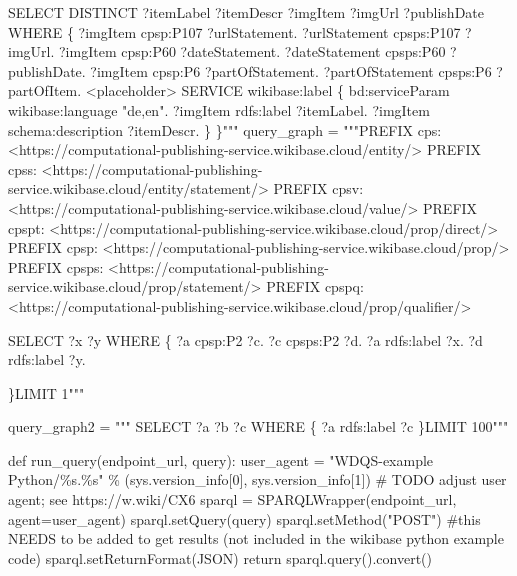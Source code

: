 \documentclass[
  a4paper,
]{book}
\newenvironment{Shaded}{\begin{snugshade}}{\end{snugshade}}
\newcommand{\AlertTok}[1]{\textcolor[rgb]{0.68,0.00,0.00}{#1}}
\newcommand{\CommentTok}[1]{\textcolor[rgb]{0.37,0.37,0.37}{#1}}
\newcommand{\ControlFlowTok}[1]{\textcolor[rgb]{0.00,0.23,0.31}{#1}}
\newcommand{\DecValTok}[1]{\textcolor[rgb]{0.68,0.00,0.00}{#1}}
\newcommand{\KeywordTok}[1]{\textcolor[rgb]{0.00,0.23,0.31}{#1}}
\newcommand{\NormalTok}[1]{\textcolor[rgb]{0.00,0.23,0.31}{#1}}
\newcommand{\OperatorTok}[1]{\textcolor[rgb]{0.37,0.37,0.37}{#1}}
\newcommand{\SpecialCharTok}[1]{\textcolor[rgb]{0.37,0.37,0.37}{#1}}
\newcommand{\StringTok}[1]{\textcolor[rgb]{0.13,0.47,0.30}{#1}}
\begin{document}
\begin{Shaded}
\begin{Highlighting}[]
\StringTok{SELECT DISTINCT ?itemLabel ?itemDescr ?imgItem ?imgUrl ?publishDate }
\StringTok{WHERE}
\StringTok{\{}
\StringTok{  ?imgItem cpsp:P107 ?urlStatement. }
\StringTok{  ?urlStatement cpsps:P107 ?imgUrl. }
\StringTok{  ?imgItem cpsp:P60 ?dateStatement. }
\StringTok{  ?dateStatement cpsps:P60 ?publishDate.}
\StringTok{  ?imgItem cpsp:P6 ?partOfStatement.}
\StringTok{  ?partOfStatement cpsps:P6 ?partOfItem.}
\StringTok{  \textless{}placeholder\textgreater{} }
\StringTok{  SERVICE wikibase:label \{}
\StringTok{      bd:serviceParam wikibase:language "de,en".}
\StringTok{      ?imgItem rdfs:label ?itemLabel.}
\StringTok{      ?imgItem schema:description ?itemDescr.}
\StringTok{    \}}
\StringTok{\}"""}
\NormalTok{query\_graph }\OperatorTok{=} \StringTok{"""PREFIX cps: \textless{}https://computational{-}publishing{-}service.wikibase.cloud/entity/\textgreater{}}
\StringTok{PREFIX cpss: \textless{}https://computational{-}publishing{-}service.wikibase.cloud/entity/statement/\textgreater{}}
\StringTok{PREFIX cpsv: \textless{}https://computational{-}publishing{-}service.wikibase.cloud/value/\textgreater{}}
\StringTok{PREFIX cpspt: \textless{}https://computational{-}publishing{-}service.wikibase.cloud/prop/direct/\textgreater{}}
\StringTok{PREFIX cpsp: \textless{}https://computational{-}publishing{-}service.wikibase.cloud/prop/\textgreater{}}
\StringTok{PREFIX cpsps: \textless{}https://computational{-}publishing{-}service.wikibase.cloud/prop/statement/\textgreater{}}
\StringTok{PREFIX cpspq: \textless{}https://computational{-}publishing{-}service.wikibase.cloud/prop/qualifier/\textgreater{}}

\StringTok{SELECT ?x ?y}
\StringTok{WHERE}
\StringTok{\{}
\StringTok{  ?a cpsp:P2 ?c.}
\StringTok{  ?c cpsps:P2 ?d.}
\StringTok{  ?a rdfs:label ?x.}
\StringTok{  ?d rdfs:label ?y.}

\StringTok{\}LIMIT 1"""}

\NormalTok{query\_graph2 }\OperatorTok{=} \StringTok{"""}
\StringTok{SELECT ?a ?b ?c}
\StringTok{WHERE}
\StringTok{\{}
\StringTok{  ?a rdfs:label ?c}
\StringTok{\}LIMIT 100"""}


\KeywordTok{def}\NormalTok{ run\_query(endpoint\_url, query):}
\NormalTok{    user\_agent }\OperatorTok{=} \StringTok{"WDQS{-}example Python/}\SpecialCharTok{\%s}\StringTok{.}\SpecialCharTok{\%s}\StringTok{"} \OperatorTok{\%}\NormalTok{ (sys.version\_info[}\DecValTok{0}\NormalTok{], sys.version\_info[}\DecValTok{1}\NormalTok{])}
    \CommentTok{\# }\AlertTok{TODO}\CommentTok{ adjust user agent; see https://w.wiki/CX6}
\NormalTok{    sparql }\OperatorTok{=}\NormalTok{ SPARQLWrapper(endpoint\_url, agent}\OperatorTok{=}\NormalTok{user\_agent)}
\NormalTok{    sparql.setQuery(query)}
\NormalTok{    sparql.setMethod(}\StringTok{"POST"}\NormalTok{) }\CommentTok{\#this NEEDS to be added to get results (not included in the wikibase python example code)}
\NormalTok{    sparql.setReturnFormat(JSON)}
    \ControlFlowTok{return}\NormalTok{ sparql.query().convert()}


\end{Highlighting}
\end{Shaded}
\end{document}
